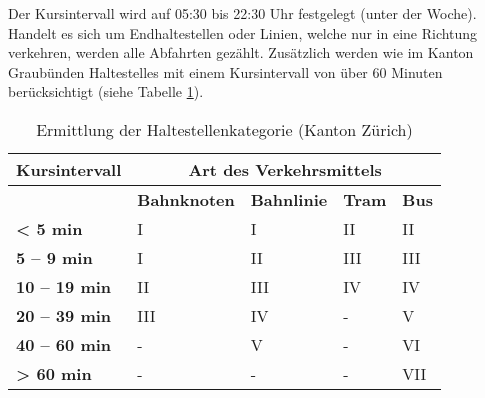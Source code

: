 Der Kursintervall wird auf 05:30 bis 22:30 Uhr festgelegt (unter der Woche).
Handelt es sich um Endhaltestellen oder Linien, welche nur in eine Richtung verkehren, werden alle Abfahrten gezählt.
Zusätzlich werden wie im Kanton Graubünden \glspl{Haltestelle} mit einem Kursintervall von über 60 Minuten berücksichtigt (siehe Tabelle \ref{table:Ermittlung der Haltestellenkategorie (Kanton Zürich)}).

\begin{table}[ht]
    \begin{tabular}[c]{l p{2.9cm} p{2.8cm} p{2.8cm} p{2.8cm}}
        \toprule
        \textbf{Kursintervall}
                                & \multicolumn{4}{c}{\textbf{Art des Verkehrsmittels}}\\
        \midrule
        \textbf{}
                                & \textbf{Bahnknoten}
                                & \textbf{Bahnlinie}
                                & \textbf{Tram}
                                & \textbf{Bus}\\
        \textbf{< 5 min}
                                & I
                                & I
                                & II
                                & II\\
        \textbf{5 -- 9 min}
                                & I
                                & II
                                & III
                                & III\\
        \textbf{10 -- 19 min}
                                & II
                                & III
                                & IV
                                & IV\\
        \textbf{20 -- 39 min}
                                & III
                                & IV
                                & -
                                & V\\
        \textbf{40 -- 60 min}
                                & -
                                & V
                                & -
                                & VI\\
        \cellcolor{red!25}\textbf{> 60 min}
                                & -
                                & -
                                & -
                                & \cellcolor{red!25}VII\\
        \bottomrule
    \end{tabular}
    \caption{Ermittlung der Haltestellenkategorie (Kanton Zürich)}
    \label{table:Ermittlung der Haltestellenkategorie (Kanton Zürich)}
\end{table}


